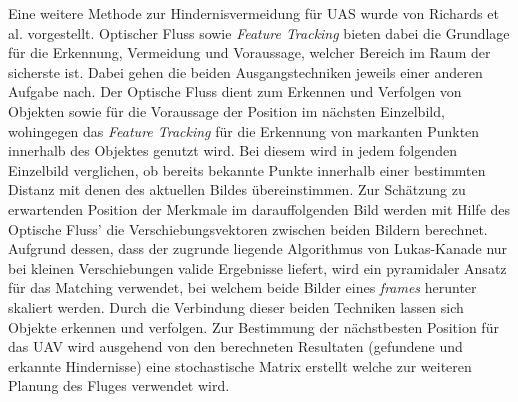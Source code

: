 \noindent
Eine weitere Methode zur Hindernisvermeidung für UAS wurde von Richards et al. \cite{richards2014obstacle} vorgestellt. Optischer Fluss sowie \emph{Feature Tracking} bieten dabei die Grundlage für die Erkennung, Vermeidung und Voraussage, welcher Bereich im Raum der sicherste ist. Dabei gehen die beiden Ausgangstechniken jeweils einer anderen Aufgabe nach. 
Der Optische Fluss dient zum Erkennen und Verfolgen von Objekten sowie für die Voraussage der Position im nächsten Einzelbild, wohingegen das \emph{Feature Tracking} \cite{shi1994good} für die Erkennung von markanten Punkten innerhalb des Objektes genutzt wird. Bei diesem wird in jedem folgenden Einzelbild verglichen, ob bereits bekannte Punkte innerhalb einer bestimmten Distanz mit denen des aktuellen Bildes übereinstimmen. Zur Schätzung zu erwartenden Position der Merkmale im darauffolgenden Bild werden mit Hilfe des Optische Fluss’ die Verschiebungsvektoren zwischen beiden Bildern berechnet. Aufgrund dessen, dass der zugrunde liegende Algorithmus von Lukas-Kanade \cite{lucas1981iterative} nur bei kleinen Verschiebungen valide Ergebnisse liefert, wird ein pyramidaler Ansatz \cite{bouguet2001pyramidal} für das Matching verwendet, bei welchem beide Bilder eines \emph{frames} herunter skaliert werden. Durch die Verbindung dieser beiden Techniken lassen sich Objekte erkennen und verfolgen. Zur Bestimmung der nächstbesten Position für das UAV wird ausgehend von den berechneten Resultaten (gefundene und erkannte Hindernisse) eine stochastische Matrix erstellt welche zur weiteren Planung des Fluges verwendet wird.\\

